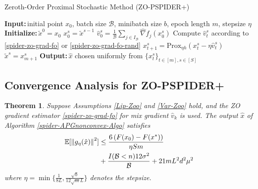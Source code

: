 \documentclass[iicol,sn-basic]{sn-jnl}
\theoremstyle{thmstyleone}%
\newtheorem{theorem}{Theorem}%
\theoremstyle{thmstyletwo}%
\theoremstyle{thmstylethree}%
\newcommand*{\Po}{\text{Prox}}
\newcommand*{\E}{\mathbb{E}}
\newcommand{\norm}[1]{\left\lVert#1\right\rVert}
\newcommand{\Initialize}{\textbf{Initialize:}{\,}}
\newcommand{\Input}{\textbf{Input:}{\,}}
\newcommand{\Output}{\textbf{Output:}{\,}}
\begin{document}
\begin{algorithm}
\caption{Zeroth-Order Proximal Stochastic Method (ZO-PSPIDER+)}
\begin{algorithmic}[1]
\State\Input initial point $x_0$, batch size $\mathcal{B}$, minibatch size $b$, epoch length $m$, stepsize $\eta$
\State\Initialize $\tilde{x}^0 = x_0$
\State ${x}_0^s = \tilde{x}^{s-1}$
\State $\hat{v}_{0}^s = \frac{1}{\mathcal{B}} \sum_{j\in I_{\mathcal{B}}} \hat{\nabla} f_j ({x}_0^s)$
\State Compute ${\hat{v}}_{t}^s$ according to \eqref{spider-zo-grad-fo} or \eqref{spider-zo-grad-fo-rand}
\State $x_{t+1}^s= \Po_{\eta h}(x_{t}^s - \eta \hat{v}_{t}^s)$
\EndFor
\State $\tilde{x}^{s} = x_{m+1}^s$
 \EndFor
 \State\Output $\hat{x}$ chosen uniformly from $\{x_{t}^s\}_{t\in [m], s\in [S]}$
\end{algorithmic}
\label{spider-APGnonconvex-Algo}
\end{algorithm}

\subsection{Convergence Analysis for ZO-PSPIDER+}

\begin{theorem}\label{spider-noncon-zoo-coord}
Suppose Assumptions \ref{Lip-Zoo} and \ref{Var-Zoo} hold, and the ZO gradient estimator \eqref{spider-zo-grad-fo} for mix gradient $\hat{v}_k$ is used. The output $\hat{x}$ of Algorithm \ref{spider-APGnonconvex-Algo} satisfies
\begin{align}
\E[\norm{g_{\eta}(\hat{x})}^2] & \leq \frac{6\left(F(x_0) - F({x}^*)\right)}{\eta Sm}\notag\\
& + \frac{I(\mathcal{B} < n)12\sigma ^2}{\mathcal{B}}+21{m L^2 d^2 \mu^2}\notag
\end{align}
where $\eta = \min\{\frac{1}{8L}, \frac{\sqrt{b}}{12 \sqrt{m}L}\}$  denotes the stepsize.
\end{theorem}
\end{document}
